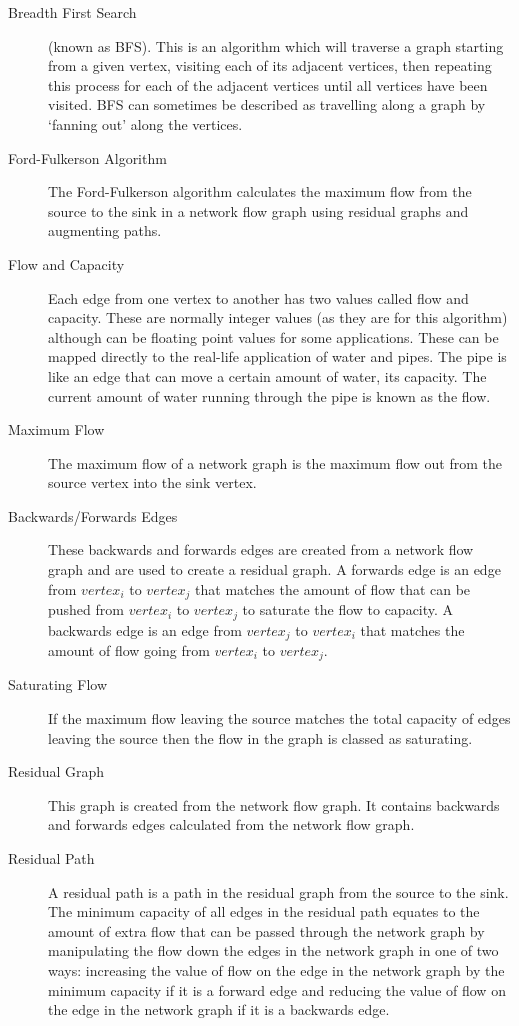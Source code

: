 \begin{description}

\item[Breadth First Search] (known as BFS). This is an algorithm which will
traverse a graph starting from a given vertex, visiting each of its
adjacent vertices, then repeating this process for each of the adjacent
vertices until all vertices have been visited. BFS can sometimes be described
as travelling along a graph by `fanning out' along the vertices.

\item[Ford-Fulkerson Algorithm] The Ford-Fulkerson algorithm calculates the
maximum flow from the source to the sink in a network flow graph using residual
graphs and augmenting paths.

\item[Flow and Capacity] Each edge from one vertex to another has two values
called flow and capacity. These are normally integer values (as they are for
this algorithm) although can be floating point values for some applications.
These can be mapped directly to the real-life application of water and pipes.
The pipe is like an edge that can move a certain amount of water, its capacity.
The current amount of water running through the pipe is known as the flow.

\item[Maximum Flow] The maximum flow of a network graph is the maximum flow
out from the source vertex into the sink vertex.

\item[Backwards/Forwards Edges] These backwards and forwards edges are
created from a network flow graph and are used to create a residual graph. A
forwards edge is an edge from $vertex_i$ to $vertex_j$ that matches the
amount of flow that can be pushed from $vertex_i$ to $vertex_j$ to
saturate the flow to capacity. A backwards edge is an edge from $vertex_j$
to $vertex_i$ that matches the amount of flow going from $vertex_i$ to
$vertex_j$.

\item[Saturating Flow] If the maximum flow leaving the source matches the total
capacity of edges leaving the source then the flow in the graph is classed as
saturating.

\item[Residual Graph] This graph is created from the network flow graph. It
contains backwards and forwards edges calculated from the network flow
graph.

\item[Residual Path] A residual path is a path in the residual graph from
the source to the sink. The minimum capacity of all edges in the residual
path equates to the amount of extra flow that can be passed through the
network graph by manipulating the flow down the edges in the network graph in
one of two ways: increasing the value of flow on the edge in the network graph
by the minimum capacity if it is a forward edge and reducing the value of flow
on the edge in the network graph if it is a backwards edge.


\end{description}
